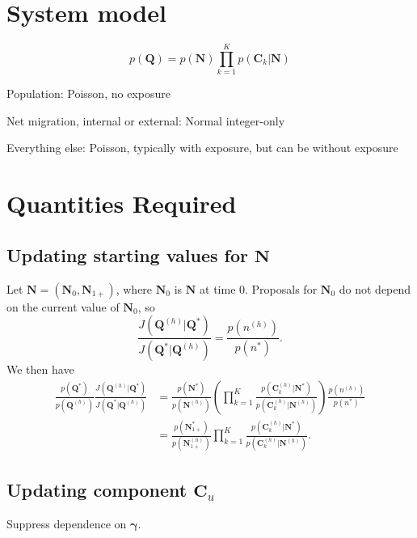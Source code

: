 \documentclass{article}
\begin{document}
\section{System model}

\begin{equation}
  p(\bm{Q}) = p(\bm{N}) \prod_{k=1}^K p(\bm{C}_k | \bm{N})
\end{equation}

Population: Poisson, no exposure

Net migration, internal or external: Normal integer-only

Everything else: Poisson, typically with exposure, but can be without exposure



\section{Quantities Required}


\subsection{Updating starting values for $\bm{N}$}

Let $\bm{N} = (\bm{N}_0, \bm{N}_{1+})$, where $\bm{N}_0$ is $\bm{N}$ at time 0.  Proposals for $\bm{N}_0$ do not depend on the current value of $\bm{N}_0$, so 
\begin{equation}
  \frac{ J(\bm{Q}^{(h)} | \bm{Q}^*) }{ J(\bm{Q}^* | \bm{Q}^{(h)}) } = \frac{ p(n^{(h)}) }{ p(n^*) }.
\end{equation}
We then have
\begin{align}
  \frac{ p(\bm{Q}^*) }{ p(\bm{Q}^{(h)}) } \frac{ J(\bm{Q}^{(h)} | \bm{Q}^*) }{ J(\bm{Q}^* | \bm{Q}^{(h)}) } & = \frac{ p(\bm{N}^*) }{ p(\bm{N}^{(h)}) } \left( \prod_{k = 1}^K \frac{ p(\bm{C}_k^{(h)} | \bm{N}^*) }{ p(\bm{C}_k^{(h)} | \bm{N}^{(h)}) } \right) \frac{ p(n^{(h)}) }{ p(n^*) } \\
 & =\frac{ p(\bm{N}_{1+}^*) }{ p(\bm{N}_{1+}^{(h)}) } \prod_{k = 1}^K \frac{ p(\bm{C}_k^{(h)} | \bm{N}^*) }{ p(\bm{C}_k^{(h)} | \bm{N}^{(h)}) } .
\end{align}

\subsection{Updating component $\bm{C}_u$}

Suppress dependence on $\bm{\gamma}$.  
\end{document}
